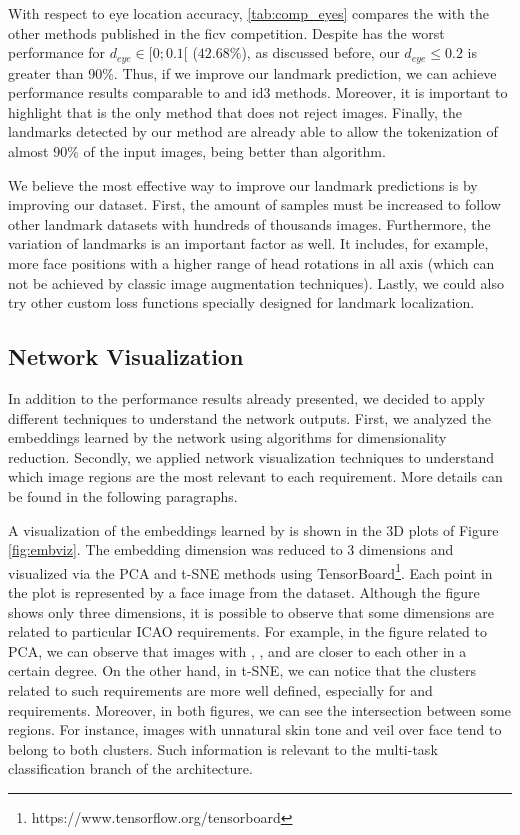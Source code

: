 With respect to eye location accuracy, \autoref{tab:comp_eyes} compares the \methodname with the other methods published in the \acs{ficv} competition. Despite \methodname has the worst performance for $d_{eye} \in [0;0.1[$ ($42.68\%$), as discussed before, our $d_{eye} \leq 0.2$ is greater than 90\%. Thus, if we improve our landmark prediction, we can achieve performance results comparable to \biopass and id3 methods. Moreover, it is important to highlight that \methodname is the only method that does not reject images. Finally, the landmarks detected by our method are already able to allow the tokenization of almost 90\% of the input images, being better than \biotest algorithm.

We believe the most effective way to improve our landmark predictions is by improving our dataset. First, the amount of samples must be increased to follow other landmark datasets with hundreds of thousands images. Furthermore, the variation of landmarks is an important factor as well. It includes, for example, more face positions with a higher range of head rotations in all axis (which can not be achieved by classic image augmentation techniques). Lastly, we could also try other custom loss functions specially designed for landmark localization.



\subsection{Network Visualization} \label{sec:netviz}

In addition to the performance results already presented, we decided to apply different techniques to understand the network outputs. First, we analyzed the embeddings learned by the network using algorithms for dimensionality reduction. Secondly, we applied network visualization techniques to understand which image regions are the most relevant to each requirement. More details can be found in the following paragraphs.

A visualization of the embeddings learned by \methodname is shown in the 3D plots of Figure \ref{fig:embviz}. The embedding dimension was reduced to 3 dimensions and visualized via the PCA and t-SNE methods using TensorBoard\footnote{https://www.tensorflow.org/tensorboard}. Each point in the plot is represented by a face image from the dataset. Although the figure shows only three dimensions, it is possible to observe that some dimensions are related to particular ICAO requirements. For example, in the figure related to PCA, we can observe that images with \variedbackground, \unnaturalskintone, and \veiloverface are closer to each other in a certain degree. On the other hand, in t-SNE, we can notice that the clusters related to such requirements are more well defined, especially for \variedbackground and \veiloverface requirements. Moreover, in both figures, we can see the intersection between some regions. For instance, images with unnatural skin tone and veil over face tend to belong to both clusters. Such information is relevant to the multi-task classification branch of the \methodname architecture. 

